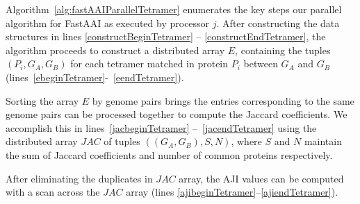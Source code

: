 \documentclass{article}[11pt]
\begin{document}
Algorithm~\ref{alg:fastAAIParallelTetramer} enumerates the key steps our parallel algorithm for FastAAI as executed by processor $j$. After constructing the data structures in lines \ref{constructBeginTetramer} -- \ref{constructEndTetramer}, the algorithm proceeds to construct a distributed array $E$, containing the tuples $(P_i, G_A, G_B)$ for each tetramer matched in protein $P_i$ between $G_A$ and $G_B$ (lines~\ref{ebeginTetramer}-~\ref{eendTetramer}).

Sorting the array $E$ by genome pairs brings the entries corresponding to the same genome pairs can be processed together to compute the Jaccard coefficients. We accomplish this in lines~\ref{jacbeginTetramer} --~\ref{jacendTetramer} using the distributed array $JAC$ of tuples $((G_A, G_B), S, N)$, where $S$ and $N$ maintain the sum of Jaccard coefficients and number of common proteins respectively.

After eliminating the duplicates in $JAC$ array, the AJI values can be computed with a scan across the $JAC$ array (lines \ref{ajibeginTetramer}--\ref{ajiendTetramer}).
\end{document}
